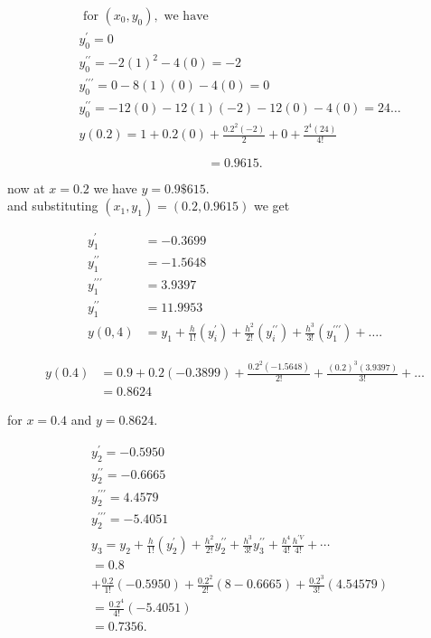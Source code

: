 \documentclass[12pt]{exam}
\begin{document}
\begin{questions}
\begin{parts}
\begin{solution}
        $$
        \begin{aligned}
        & \text { for }\left(x_{0}, y_{0}\right), \text { we have } \\
        & y_{0}^{\prime}=0 \\
        & y_{0}^{\prime \prime}=-2(1)^{2}-4(0)=-2 \\
        & y_{0}^{\prime \prime \prime}=0-8(1)(0)-4(0)=0 \\
        & y_{0}^{\prime \prime}=-12(0)-12(1)(-2)-12(0)-4(0)=24 \ldots \\
        & y(0.2)=1+0.2(0)+\frac{0.2^{2}(-2)}{2}+0+\frac{2^{4}(24)}{4!}
        \end{aligned}
        $$
        
        $$
        =0.9615 .
        $$
        
        now at $x=0.2$ we have $y=0.9 \$ 615$.\\
        and substituting $\left(x_{1}, y_{1}\right)=(0.2,0.9615)$ we get
        
        $$
        \begin{aligned}
        y_{1}^{\prime} & =-0.3699 \\
        y_{1}^{\prime \prime} & =-1.5648 \\
        y_{1}^{\prime \prime \prime} & =3.9397 \\
        y_{1}^{\prime \prime} & =11.9953 \\
        y(0,4) & =y_{1}+\frac{h}{1!}\left(y_{i}^{\prime}\right)+\frac{h^{2}}{2!}\left(y_{i}^{\prime \prime}\right)+\frac{h^{3}}{3!}\left(y_{1}^{\prime \prime \prime}\right)+\ldots .
        \end{aligned}
        $$
        
        $$
        \begin{aligned}
        y(0.4) & =0.9+0.2(-0.3899)+\frac{0.2^{2}(-1.5648)}{2!}+\frac{(0.2)^{3}(3.9397)}{3!}+\ldots \\
        & =0.8624
        \end{aligned}
        $$
        
        for $x=0.4$ and $y=0.8624$.
        
        $$
        \begin{aligned}
        & y_{2}^{\prime}=-0.5950 \\
        & y_{2}^{\prime \prime}=-0.6665 \\
        & y_{2}^{\prime \prime \prime}=4.4579 \\
        & y_2^{\prime \prime \prime}=-5.4051 \\
        & y_{3}=y_{2}+\frac{h}{1!}\left(y_{2}^{\prime}\right)+\frac{h^{2}}{2!} y_{2}^{\prime \prime}+\frac{h^{3}}{3!} y_{3}^{\prime \prime}+\frac{h^{4}}{4!} \frac{h^{\prime V}}{4!}+\cdots \\
        &=0.8 \\
        &+\frac{0.2}{1!}(-0.5950)+\frac{0.2^{2}}{2!}(8-0.6665)+\frac{0.2^{3}}{3!}(4.54579) \\
        &=\frac{0.2^{4}}{4!}(-5.4051) \\
        &=0.7356 .
        \end{aligned}
        $$
        

\end{solution}
\end{parts}
\end{questions}
\end{document}
